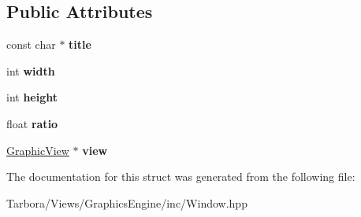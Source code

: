 \subsection*{Public Attributes}
\begin{DoxyCompactItemize}
\item 
\mbox{\label{structTarbora_1_1WindowProps_af26af100b7338ec593d38ab09c8646db}} 
const char $\ast$ {\bfseries title}
\item 
\mbox{\label{structTarbora_1_1WindowProps_aa95a93cc65364a483c4cb509d43e8fd8}} 
int {\bfseries width}
\item 
\mbox{\label{structTarbora_1_1WindowProps_a6896cbaf94f4aac92eeb8cb95291c67c}} 
int {\bfseries height}
\item 
\mbox{\label{structTarbora_1_1WindowProps_a57f0dee710d4838d5bbfb08245fe5654}} 
float {\bfseries ratio}
\item 
\mbox{\label{structTarbora_1_1WindowProps_ac0085bf4f2cdc6a433ecbc44e74df22f}} 
\hyperlink{classTarbora_1_1GraphicView}{Graphic\+View} $\ast$ {\bfseries view}
\end{DoxyCompactItemize}


The documentation for this struct was generated from the following file\+:\begin{DoxyCompactItemize}
\item 
Tarbora/\+Views/\+Graphics\+Engine/inc/Window.\+hpp\end{DoxyCompactItemize}
